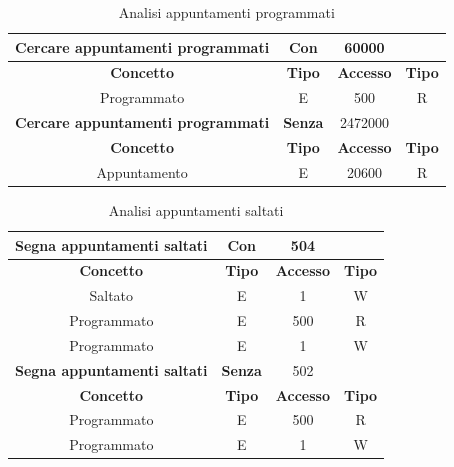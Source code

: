 \documentclass[11pt,a4paper]{article}
\begin{document}
\begin{table}[H]
\begin{tabular}{|c|c|c|c|}
\hline \textbf{Cercare appuntamenti programmati} & \textbf{Con}   & \textbf{60000}   &               \\
\hline \textbf{Concetto}                         & \textbf{Tipo}  & \textbf{Accesso} & \textbf{Tipo} \\
\hline Programmato                               & E              & 500              & R             \\
\hline \textbf{Cercare appuntamenti programmati} & \textbf{Senza} & 2472000          &               \\
\hline \textbf{Concetto}                         & \textbf{Tipo}  & \textbf{Accesso} & \textbf{Tipo} \\
\hline Appuntamento                              & E              & 20600            & R             \\
\hline
\end{tabular}
    \caption{Analisi appuntamenti programmati}
    \label{tab:programmati}
\end{table}

\begin{table}[H]
\begin{tabular}{|c|c|c|c|}
\hline \textbf{Segna appuntamenti saltati} & \textbf{Con}   & \textbf{504}     &               \\
\hline \textbf{Concetto}                   & \textbf{Tipo}  & \textbf{Accesso} & \textbf{Tipo} \\
\hline Saltato                             & E              & 1                & W             \\
\hline Programmato                         & E              & 500              & R             \\
\hline Programmato                         & E              & 1                & W             \\
\hline \textbf{Segna appuntamenti saltati} & \textbf{Senza} & 502              &               \\
\hline \textbf{Concetto}                   & \textbf{Tipo}  & \textbf{Accesso} & \textbf{Tipo} \\
\hline Programmato                         & E              & 500              & R             \\
\hline Programmato                         & E              & 1                & W             \\
\hline
\end{tabular}
    \caption{Analisi appuntamenti saltati}
    \label{tab:saltati}
\end{table}
\end{document}
